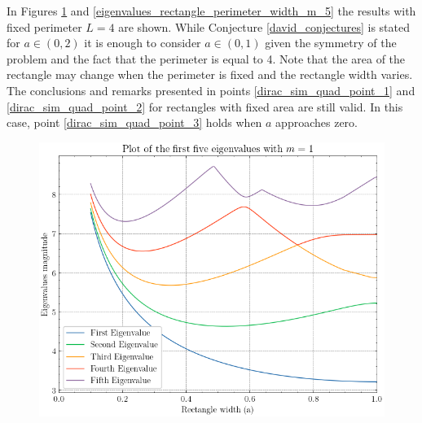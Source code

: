 In Figures \ref{eigenvalues_rectangle_perimeter_width_m_1} and \ref{eigenvalues_rectangle_perimeter_width_m_5} the results with fixed perimeter \(L=4\) are shown. While Conjecture \ref{david_conjectures} is stated for \(a \in (0, 2)\) it is enough to consider \(a \in (0, 1)\) given the symmetry of the problem and the fact that the perimeter is equal to 4. Note that the area of the rectangle may change when the perimeter is fixed and the rectangle width varies. The conclusions and remarks presented in points \ref{dirac_sim_quad_point_1} and \ref{dirac_sim_quad_point_2} for rectangles with fixed area are still valid. In this case, point \ref{dirac_sim_quad_point_3} holds when \(a\) approaches zero.

\begin{figure}[!htb]
    \centering
    \begin{minipage}{.5\textwidth}
      \centering
      \includegraphics[width=\linewidth]{Images/Dirac/quad/eigenvalues_rectangle_perimeter_width_m_1.png}
      \captionsetup{width=0.9\linewidth} %
      \label{eigenvalues_rectangle_perimeter_width_m_1}
    \end{minipage}%
    \begin{minipage}{.5\textwidth}
      \centering

\end{minipage}
\end{figure}
